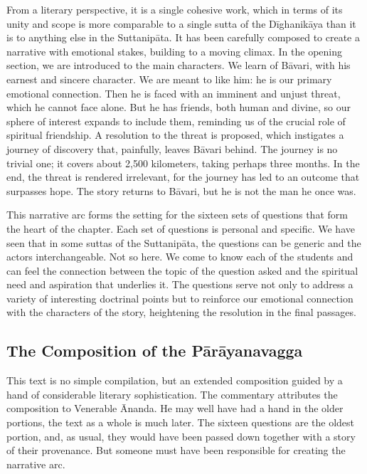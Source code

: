\documentclass[12pt,openany]{book}%
\begin{document}
From a literary perspective, it is a single cohesive work, which in terms of its unity and scope is more comparable to a single sutta of the \textsanskrit{Dīghanikāya} than it is to anything else in the \textsanskrit{Suttanipāta}. It has been carefully composed to create a narrative with emotional stakes, building to a moving climax. In the opening section, we are introduced to the main characters. We learn of \textsanskrit{Bāvari}, with his earnest and sincere character. We are meant to like him: he is our primary emotional connection. Then he is faced with an imminent and unjust threat, which he cannot face alone. But he has friends, both human and divine, so our sphere of interest expands to include them, reminding us of the crucial role of spiritual friendship. A resolution to the threat is proposed, which instigates a journey of discovery that, painfully, leaves \textsanskrit{Bāvari} behind. The journey is no trivial one; it covers about 2,500 kilometers, taking perhaps three months. In the end, the threat is rendered irrelevant, for the journey has led to an outcome that surpasses hope. The story returns to \textsanskrit{Bāvari}, but he is not the man he once was.

This narrative arc forms the setting for the sixteen sets of questions that form the heart of the chapter. Each set of questions is personal and specific. We have seen that in some suttas of the \textsanskrit{Suttanipāta}, the questions can be generic and the actors interchangeable. Not so here. We come to know each of the students and can feel the connection between the topic of the question asked and the spiritual need and aspiration that underlies it. The questions serve not only to address a variety of interesting doctrinal points but to reinforce our emotional connection with the characters of the story, heightening the resolution in the final passages.

\subsection*{The Composition of the \textsanskrit{Pārāyanavagga}}

This text is no simple compilation, but an extended composition guided by a hand of considerable literary sophistication. The commentary attributes the composition to Venerable Ānanda. He may well have had a hand in the older portions, the text as a whole is much later. The sixteen questions are the oldest portion, and, as usual, they would have been passed down together with a story of their provenance. But someone must have been responsible for creating the narrative arc.
\end{document}
